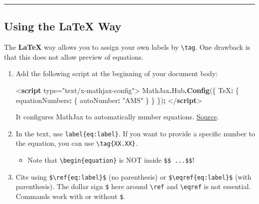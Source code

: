 \documentclass[
]{book}
\newenvironment{Shaded}{\begin{snugshade}}{\end{snugshade}}
\newcommand{\AttributeTok}[1]{\textcolor[rgb]{0.13,0.29,0.53}{#1}}
\newcommand{\DataTypeTok}[1]{\textcolor[rgb]{0.13,0.29,0.53}{#1}}
\newcommand{\FunctionTok}[1]{\textcolor[rgb]{0.13,0.29,0.53}{\textbf{#1}}}
\newcommand{\KeywordTok}[1]{\textcolor[rgb]{0.13,0.29,0.53}{\textbf{#1}}}
\newcommand{\NormalTok}[1]{#1}
\newcommand{\OperatorTok}[1]{\textcolor[rgb]{0.81,0.36,0.00}{\textbf{#1}}}
\newcommand{\OtherTok}[1]{\textcolor[rgb]{0.56,0.35,0.01}{#1}}
\newcommand{\StringTok}[1]{\textcolor[rgb]{0.31,0.60,0.02}{#1}}
\providecommand{\tightlist}{%
  \setlength{\itemsep}{0pt}\setlength{\parskip}{0pt}}
\theoremstyle{definition}
\theoremstyle{definition}
\theoremstyle{definition}
\theoremstyle{definition}
\theoremstyle{remark}
\begin{document}
\begin{center}\rule{0.5\linewidth}{0.5pt}\end{center}

\subsection{Using the LaTeX Way}\label{using-the-latex-way}

The \textbf{LaTeX} way allows you to assign your own labels by \texttt{\textbackslash{}tag}. One drawback is that this does not allow preview of equations.

\begin{enumerate}
\def\labelenumi{\arabic{enumi}.}
\item
  Add the following script at the beginning of your document body:

\begin{Shaded}
\begin{Highlighting}[]
\DataTypeTok{\textless{}}\KeywordTok{script}\OtherTok{ type=}\StringTok{"text/x{-}mathjax{-}config"}\DataTypeTok{\textgreater{}}
\NormalTok{MathJax}\OperatorTok{.}\AttributeTok{Hub}\OperatorTok{.}\FunctionTok{Config}\NormalTok{(\{}
  \DataTypeTok{TeX}\OperatorTok{:}\NormalTok{ \{ }\DataTypeTok{equationNumbers}\OperatorTok{:}\NormalTok{ \{ }\DataTypeTok{autoNumber}\OperatorTok{:} \StringTok{"AMS"}\NormalTok{ \} \}}
\NormalTok{\})}\OperatorTok{;}
\DataTypeTok{\textless{}/}\KeywordTok{script}\DataTypeTok{\textgreater{}}
\end{Highlighting}
\end{Shaded}

  It configures MathJax to automatically number equations. \href{https://stackoverflow.com/a/55163121/10108921}{Source}.
\item
  In the text, use \texttt{label\{eq:label\}}. If you want to provide a specific number to the equation, you can use \texttt{\textbackslash{}tag\{XX.XX\}}.

  \begin{itemize}
  \tightlist
  \item
    Note that \texttt{\textbackslash{}begin\{equation\}} is {NOT} inside \texttt{\$\$\ ...\$\$}!
  \end{itemize}
\item
  Cite using \texttt{\$\textbackslash{}ref\{eq:label\}\$} (no parenthesis) or \texttt{\$\textbackslash{}eqref\{eq:label\}\$} (with parenthesis). The dollar sign \texttt{\$} here around \texttt{\textbackslash{}ref} and \texttt{\textbackslash{}eqref} is not essential. Commands work with or without \texttt{\$}.


\end{enumerate}
\end{document}
